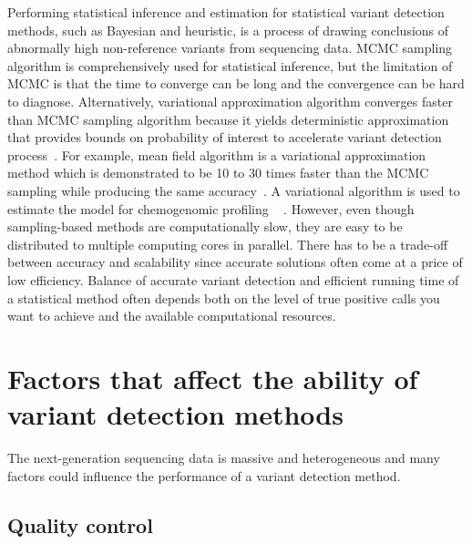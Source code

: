 \documentclass[a4,center,fleqn]{NAR}
\begin{document}
Performing statistical inference and estimation for statistical variant detection methods, such as Bayesian and heuristic, is a process of drawing conclusions of abnormally high non-reference variants from sequencing data. 
MCMC sampling algorithm is comprehensively used for statistical inference, but the limitation of MCMC is that the time to converge can be long and the convergence can be hard to diagnose.
Alternatively, variational approximation algorithm converges faster than MCMC sampling algorithm because it yields deterministic approximation that provides bounds on probability of interest to accelerate variant detection process~\citep{jordan1999introduction}.
For example, mean field algorithm is a variational approximation method which is demonstrated to be 10 to 30 times faster than the MCMC sampling while producing the same accuracy~\citep{peterson1989explorations}.
A variational algorithm is used to estimate the model for chemogenomic profiling ~\citep{flaherty2005latent} .
However, even though sampling-based methods are computationally slow, they are easy to be distributed to multiple computing cores in parallel.
There has to be a trade-off between accuracy and scalability since accurate solutions often come at a price of low efficiency.
Balance of accurate variant detection and efficient running time of a statistical method often depends both on the level of true positive calls you want to achieve and the available computational resources.





\section{Factors that affect the ability of variant detection methods}

The next-generation sequencing data is massive and heterogeneous and many factors could influence the performance of a variant detection method.
\subsection{Quality control}
\end{document}
